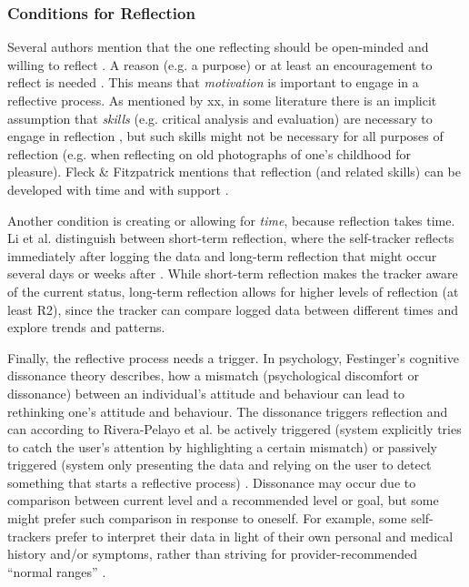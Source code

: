 \subsubsection{Conditions for Reflection}
Several authors mention that the one reflecting should be open-minded and willing to reflect \cite{insertTwoStudiesHere}. A reason (e.g. a purpose) or at least an encouragement to reflect is needed \cite{Fleck, Mols}. This means that \textit{motivation} is important to engage in a reflective process. As mentioned by xx, in some literature there is an implicit assumption that \textit{skills} (e.g. critical analysis and evaluation) are necessary to engage in reflection \cite{insertTwoStudiesHere, Rogers}, but such skills might not be necessary for all purposes of reflection (e.g. when reflecting on old photographs of one’s childhood for pleasure). Fleck \& Fitzpatrick mentions that reflection (and related skills) can be developed with time and with support \cite{Fleck}. 

Another condition is creating or allowing for \textit{time}, because reflection takes time. Li et al. distinguish between short-term reflection, where the self-tracker reflects immediately after logging the data and long-term reflection that might occur several days or weeks after \cite{Li2010}. While short-term reflection makes the tracker aware of the current status, long-term reflection allows for higher levels of reflection (at least R2), since the tracker can compare logged data between different times and explore trends and patterns. 

Finally, the reflective process needs a trigger. In psychology, Festinger’s cognitive dissonance theory describes, how a mismatch (psychological discomfort or dissonance) between an individual's attitude and behaviour can lead to rethinking one’s attitude and behaviour. The dissonance triggers reflection and can according to Rivera-Pelayo et al. be actively triggered (system explicitly tries to catch the user’s attention by highlighting a certain mismatch) or passively triggered (system only presenting the data and relying on the user to detect something that starts a reflective process) \cite{Rivera}. Dissonance may occur due to comparison between current level and a recommended level or goal, but some might prefer such comparison in response to oneself. For example, some self-trackers prefer to interpret their data in light of their own personal and medical history and/or symptoms, rather than striving for provider-recommended “normal ranges” \cite{Ancker2015}. 


